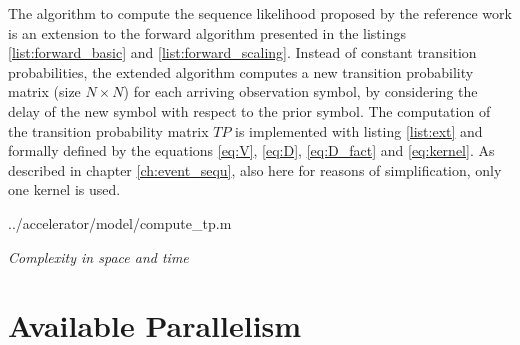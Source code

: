 \documentclass[mscthesis]{usiinfthesis}
\begin{document}
The algorithm to compute the sequence likelihood proposed by the reference work
is an extension to the forward algorithm presented in the listings
\ref{list:forward_basic} and \ref{list:forward_scaling}. Instead of constant
transition probabilities, the extended algorithm computes a new transition
probability matrix (size $ N \times N$) for each arriving observation symbol,
by considering the delay of the new symbol with respect to the prior symbol.
The computation of the transition probability matrix $ TP $ is implemented with
listing \ref{list:ext} and formally defined by the equations \ref{eq:V},
\ref{eq:D}, \ref{eq:D_fact} and \ref{eq:kernel}. As described in chapter
\ref{ch:event_sequ}, also here for reasons of simplification, only one kernel
is used.


    {../accelerator/model/compute_tp.m}

\emph{\color{red}Complexity in space and time}

\section{Available Parallelism}
\label{ch:analysis_parallel}
\end{document}
